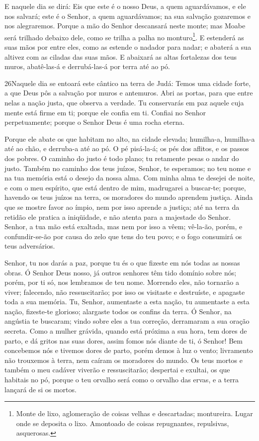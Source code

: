E naquele dia se dirá: Eis que este é o nosso Deus, a quem
aguardávamos, e ele nos salvará; este é o Senhor, a quem
aguardávamos; na sua salvação gozaremos e nos alegraremos.
Porque a mão do Senhor descansará neste monte; mas Moabe será
trilhado debaixo dele, como se trilha a palha no
monturo\footnote{Monte de lixo, aglomeração de coisas velhas e
descartadas; montureira. Lugar onde se deposita o lixo. Amontoado de
coisas repugnantes, repulsivas, asquerosas.}. E estenderá as
suas mãos por entre eles, como as estende o nadador para nadar; e
abaterá a sua altivez com as ciladas das suas mãos. E
abaixará as altas fortalezas dos teus muros, abatê-las-á e
derrubá-las-á por terra até ao pó.

\medskip

\lettrine{26}{}Naquele dia se entoará este cântico na terra de
Judá: Temos uma cidade forte, a que Deus pôs a salvação por muros e
antemuros. Abri as portas, para que entre nelas a nação justa,
que observa a verdade. Tu conservarás em paz aquele cuja mente
está firme em ti; porque ele confia em ti. Confiai no Senhor
perpetuamente; porque o Senhor Deus é uma rocha eterna.

Porque ele abate os que habitam no alto, na cidade elevada;
humilha-a, humilha-a até ao chão, e derruba-a até ao pó. O pé
pisá-la-á; os pés dos aflitos, e os passos dos pobres. O caminho
do justo é todo plano; tu retamente pesas o andar do justo.
Também no caminho dos teus juízos, Senhor, te esperamos; no teu
nome e na tua memória está o desejo da nossa alma. Com minha
alma te desejei de noite, e com o meu espírito, que está dentro de
mim, madrugarei a buscar-te; porque, havendo os teus juízos na
terra, os moradores do mundo aprendem justiça. Ainda que se
mostre favor ao ímpio, nem por isso aprende a justiça; até na terra
da retidão ele pratica a iniqüidade, e não atenta para a majestade
do Senhor. Senhor, a tua mão está exaltada, mas nem por isso
a vêem; vê-la-ão, porém, e confundir-se-ão por causa do zelo que
tens do teu povo; e o fogo consumirá os teus adversários.

Senhor, tu nos darás a paz, porque tu és o que fizeste em nós
todas as nossas obras. Ó Senhor Deus nosso, já outros
senhores têm tido domínio sobre nós; porém, por ti só, nos lembramos
de teu nome. Morrendo eles, não tornarão a viver; falecendo,
não ressuscitarão; por isso os visitaste e destruíste, e apagaste
toda a sua memória. Tu, Senhor, aumentaste a esta nação, tu
aumentaste a esta nação, fizeste-te glorioso; alargaste todos os
confins da terra. Ó Senhor, na angústia te buscaram; vindo
sobre eles a tua correção, derramaram a sua oração secreta.
Como a mulher grávida, quando está próxima a sua hora, tem
dores de parto, e dá gritos nas suas dores, assim fomos nós diante
de ti, ó Senhor! Bem concebemos nós e tivemos dores de parto,
porém demos à luz o vento; livramento não trouxemos à terra, nem
caíram os moradores do mundo. Os teus mortos e também o meu
cadáver viverão e ressuscitarão; despertai e exultai, os que
habitais no pó, porque o teu orvalho será como o orvalho das ervas,
e a terra lançará de si os mortos.

